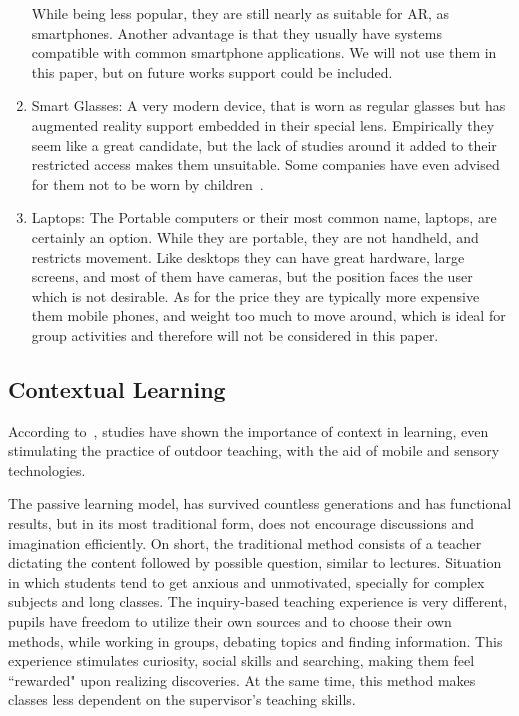 \documentclass[a4paper,twoside]{article}
\begin{document}
\begin{enumerate}
While being less popular, they are still nearly as suitable for AR, as smartphones. Another advantage is that they usually have systems compatible with common smartphone applications. We will not use them in this paper, but on future works support could be included.

\item Smart Glasses: A very modern device, that is worn as regular glasses but has augmented reality support embedded in their special lens. Empirically they seem like a great candidate, but the lack of studies around it added to their restricted access makes them unsuitable. Some companies have even advised for them not to be worn by children~\cite{FAQGoogl98}.

\item Laptops: The Portable computers or their most common name, laptops, are certainly an option. While they are portable, they are not handheld, and restricts movement. Like desktops they can have great hardware, large screens, and most of them have cameras, but the position faces the user which is not desirable. As for the price they are typically more expensive them mobile phones, and weight too much to move around, which is ideal for group activities and therefore will not be considered in this paper.
\end{enumerate}

\subsection{Contextual Learning}

\noindent According to~\cite{chiang2014augmented}, studies have shown the importance of context in learning, even stimulating the practice of outdoor teaching, with the aid of mobile and sensory technologies. 

The passive learning model, has survived countless generations and has functional results, but in its most traditional form, does not encourage discussions and imagination efficiently. On short, the traditional method consists of a teacher dictating the content followed by possible question, similar to lectures. Situation in which students tend to get anxious and unmotivated, specially for complex subjects and long classes. The inquiry-based teaching experience is very different, 
pupils have freedom to utilize their own sources and to choose their own methods, while working in groups, debating topics and finding information. This experience stimulates curiosity, social skills and searching, making them feel ``rewarded" upon realizing discoveries. At the same time, this method makes classes less dependent on the supervisor's teaching skills.
\end{document}
